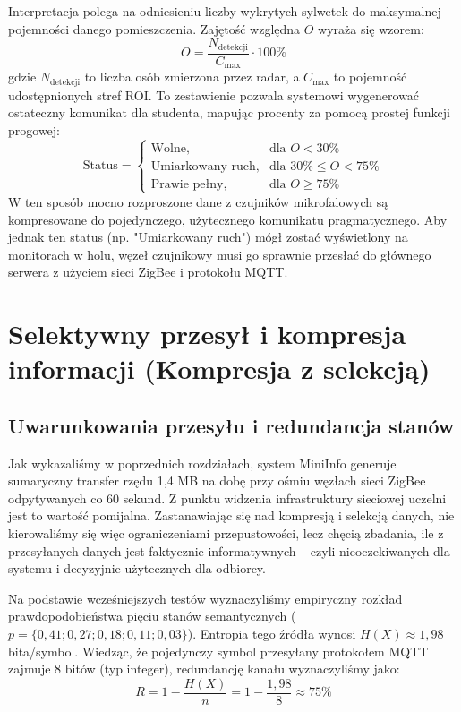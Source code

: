 \documentclass[14pt,a4paper]{extarticle}
\begin{document}
Interpretacja polega na odniesieniu liczby wykrytych sylwetek do maksymalnej pojemności danego pomieszczenia. Zajętość względna $O$ wyraża się wzorem:
\begin{equation}
    O = \frac{N_{\text{detekcji}}}{C_{\text{max}}} \cdot 100\%
\end{equation}
gdzie $N_{\text{detekcji}}$ to liczba osób zmierzona przez radar, a $C_{\text{max}}$ to pojemność udostępnionych stref ROI. To zestawienie pozwala systemowi wygenerować ostateczny komunikat dla studenta, mapując procenty za pomocą prostej funkcji progowej:
\begin{equation}
    \text{Status} = 
    \begin{cases} 
    \text{Wolne}, & \text{dla } O < 30\% \\
    \text{Umiarkowany ruch}, & \text{dla } 30\% \le O < 75\% \\
    \text{Prawie pełny}, & \text{dla } O \ge 75\% 
    \end{cases}
\end{equation}
W ten sposób mocno rozproszone dane z czujników mikrofalowych są kompresowane do pojedynczego, użytecznego komunikatu pragmatycznego. Aby jednak ten status (np. "Umiarkowany ruch") mógł zostać wyświetlony na monitorach w holu, węzeł czujnikowy musi go sprawnie przesłać do głównego serwera z użyciem sieci ZigBee i protokołu MQTT.

\section{Selektywny przesył i kompresja informacji (Kompresja z selekcją)}

\subsection{Uwarunkowania przesyłu i redundancja stanów}
Jak wykazaliśmy w poprzednich rozdziałach, system MiniInfo generuje sumaryczny transfer rzędu 1,4 MB na dobę przy ośmiu węzłach sieci ZigBee odpytywanych co 60 sekund. Z punktu widzenia infrastruktury sieciowej uczelni jest to wartość pomijalna. Zastanawiając się nad kompresją i selekcją danych, nie kierowaliśmy się więc ograniczeniami przepustowości, lecz chęcią zbadania, ile z przesyłanych danych jest faktycznie informatywnych – czyli nieoczekiwanych dla systemu i decyzyjnie użytecznych dla odbiorcy.

Na podstawie wcześniejszych testów wyznaczyliśmy empiryczny rozkład prawdopodobieństwa pięciu stanów semantycznych ($p = \{0,41; 0,27; 0,18; 0,11; 0,03\}$). Entropia tego źródła wynosi $H(X) \approx 1,98$ bita/symbol. Wiedząc, że pojedynczy symbol przesyłany protokołem MQTT zajmuje 8 bitów (typ integer), redundancję kanału wyznaczyliśmy jako:
\begin{equation}
R = 1 - \frac{H(X)}{n} = 1 - \frac{1{,}98}{8} \approx 75\%
\end{equation}
\end{document}
